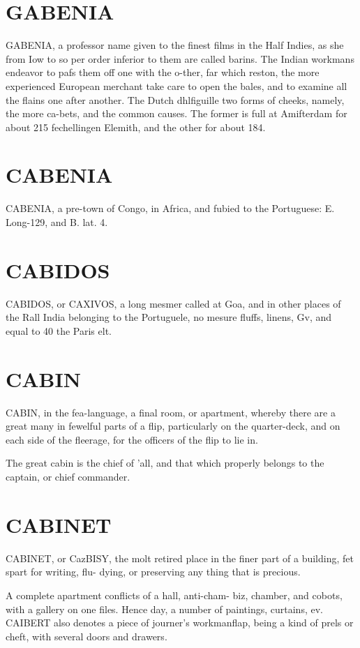 \documentclass{article}
\begin{document}
\section*{GABENIA}
GABENIA, a professor name given to the finest films in the Half Indies, as she from Iow to so per order inferior to them are called barins. The Indian workmans endeavor to pafs them off one with the o-ther, far which reston, the more experienced European merchant take care to open the bales, and to examine all the flains one after another. The Dutch dhlfiguille two forms of cheeks, namely, the more ca-bets, and the common causes. The former is full at Amifterdam for about 215 fechellingen Elemith, and the other for about 184.

\section*{CABENIA}
CABENIA, a pre-town of Congo, in Africa, and fubied to the Portuguese: E. Long-129, and B. lat. 4.

\section*{CABIDOS}
CABIDOS, or CAXIVOS, a long mesmer called at Goa, and in other places of the Rall India belonging to the Portuguele, no mesure fluffs, linens, Gv, and equal to 40 the Paris elt.

\section*{CABIN}
CABIN, in the fea-language, a final room, or apartment, whereby there are a great many in fewelful parts of a flip, particularly on the quarter-deck, and on each side of the fleerage, for the officers of the flip to lie in.

The great cabin is the chief of ’all, and that which properly belongs to the captain, or chief commander.

\section*{CABINET}
CABINET, or CazBISY, the molt retired place in the finer part of a building, fet spart for writing, flu- dying, or preserving any thing that is precious.

A complete apartment conflicts of a hall, anti-cham- biz, chamber, and cobots, with a gallery on one files. Hence day, a number of paintings, curtains, ev. CAIBERT also denotes a piece of journer's workmanflap, being a kind of prels or cheft, with several doors and drawers.
\end{document}
